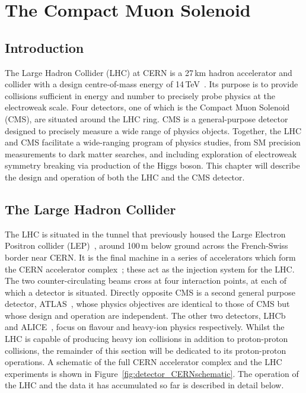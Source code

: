 \chapter{The Compact Muon Solenoid}
\label{chap:detector}

\section{Introduction}

The Large Hadron Collider (LHC) at CERN is a 27\,km hadron accelerator and collider with a design centre-of-mass energy of 14\,TeV~\cite{LHC}.
Its purpose is to provide collisions sufficient in energy and number to precisely probe physics at the electroweak scale.
Four detectors, one of which is the Compact Muon Solenoid (CMS), are situated around the LHC ring.
CMS is a general-purpose detector designed to precisely measure a wide range of physics objects.
Together, the LHC and CMS facilitate a wide-ranging program of physics studies, from SM precision measurements to dark matter searches, 
and including exploration of electroweak symmetry breaking via production of the Higgs boson.
This chapter will describe the design and operation of both the LHC and the CMS detector.

\section{The Large Hadron Collider}

The LHC is situated in the tunnel that previously housed the Large Electron Positron collider (LEP)~\cite{LEP}, 
around 100\,m below ground across the French-Swiss border near CERN.
It is the final machine in a series of accelerators which form the CERN accelerator complex~\cite{CERNcomplex}; 
these  act as the injection system for the LHC.
The two counter-circulating beams cross at four interaction points, at each of which a detector is situated.
Directly opposite CMS is a second general purpose detector, ATLAS~\cite{ATLAS}, 
whose physics objectives are identical to those of CMS but whose design and operation are independent. 
The other two detectors, LHCb~\cite{LHCb} and ALICE~\cite{ALICE}, focus on flavour and heavy-ion physics respectively.
Whilst the LHC is capable of producing heavy ion collisions in addition to proton-proton collisions, 
the remainder of this section will be dedicated to its proton-proton operations.
A schematic of the full CERN accelerator complex and the LHC experiments is shown in Figure~\ref{fig:detector_CERNschematic}.
The operation of the LHC and the data it has accumulated so far is described in detail below.

